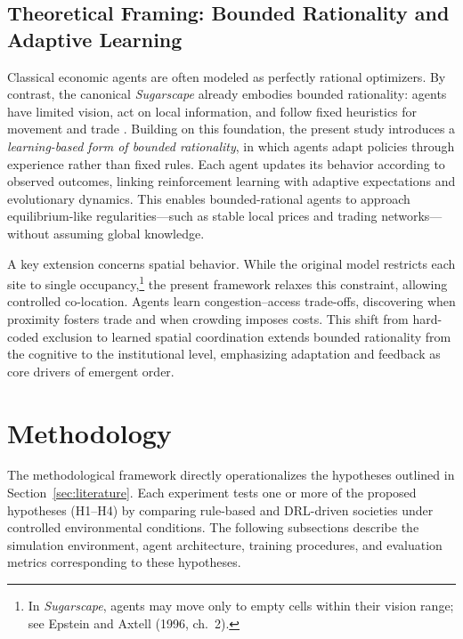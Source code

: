 \documentclass[pdflatex,sn-mathphys-num]{sn-jnl}%
\theoremstyle{thmstyleone}%
\theoremstyle{thmstyletwo}%
\theoremstyle{thmstylethree}%
\begin{document}
\subsection{Theoretical Framing: Bounded Rationality and Adaptive Learning}

Classical economic agents are often modeled as perfectly rational optimizers.  
By contrast, the canonical \textit{Sugarscape} already embodies bounded rationality: agents have limited vision, act on local information, and follow fixed heuristics for movement and trade \citep{EpsteinAxtell1996}.  
Building on this foundation, the present study introduces a \textit{learning-based form of bounded rationality}, in which agents adapt policies through experience rather than fixed rules.  
Each agent updates its behavior according to observed outcomes, linking reinforcement learning with adaptive expectations and evolutionary dynamics.  
This enables bounded-rational agents to approach equilibrium-like regularities—such as stable local prices and trading networks—without assuming global knowledge.

A key extension concerns spatial behavior.  
While the original model restricts each site to single occupancy,\footnote{In \textit{Sugarscape}, agents may move only to empty cells within their vision range; see Epstein and Axtell (1996, ch.~2).}  
the present framework relaxes this constraint, allowing controlled co-location.  
Agents learn congestion–access trade-offs, discovering when proximity fosters trade and when crowding imposes costs.  
This shift from hard-coded exclusion to learned spatial coordination extends bounded rationality from the cognitive to the institutional level, emphasizing adaptation and feedback as core drivers of emergent order.


\section{Methodology}
\label{sec:methodology}

The methodological framework directly operationalizes the hypotheses outlined in Section~\ref{sec:literature}.  
Each experiment tests one or more of the proposed hypotheses (H1–H4) by comparing rule-based and DRL-driven societies under controlled environmental conditions.  
The following subsections describe the simulation environment, agent architecture, training procedures, and evaluation metrics corresponding to these hypotheses.
\end{document}
